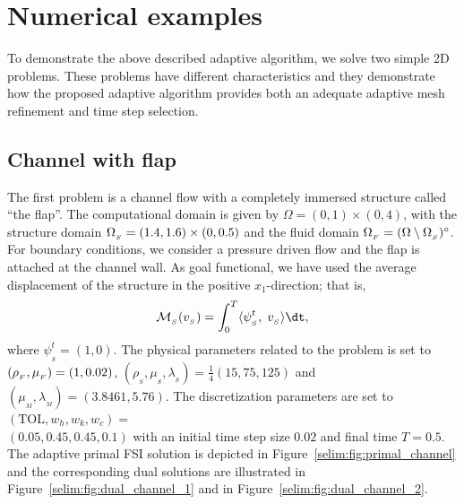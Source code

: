 \section{Numerical examples}

To demonstrate the above described adaptive algorithm, we solve two
simple 2D problems. These problems have different characteristics and
they demonstrate how the proposed adaptive algorithm provides both an
adequate adaptive mesh refinement and time step selection.

\subsection{Channel with flap}

The first problem is a channel flow with a completely immersed
structure called ``the flap''. The computational domain is given by
$\Omega = (0, 1)\times (0,4)$, with the structure domain $\Omega_{_{S}} = (1.4,
1.6)\times (0, 0.5)$ and the fluid domain $\Omega_{_{F}} = (\Omega\setminus
\Omega_{_{S}})^{\circ}$. For boundary conditions, we consider a pressure driven
flow and the flap is attached at the channel wall. As goal functional,
we have used the average displacement of the structure in the positive
$x_1$-direction; that is,
\begin{equation}
\label{selim:eq:goalfunctional_channel}
\M_{_{S}}(v_{_{S}}) = \int_0^T \langle \psi^t_{_{S}},\;
v_{_{S}}\rangle \dt,
\end{equation}
where $\psi^t_{_{S}} = (1,0)$. The physical parameters related to the
problem is set to $(\rho_{_{F}},\mu_{_{F}}) = (1, 0.02)$,
$(\rho_{_{S}},\mu_{_{S}}, \lambda_{_{S}}) = \tfrac{1}{4}(15, 75, 125)$
and $(\mu_{_{M}}, \lambda_{_{M}}) = (3.8461, 5.76)$. The
discretization parameters are set to $(\mathrm{TOL}, w_h, w_k,w_c) =$\\
$(0.05, 0.45, 0.45, 0.1)$ with an initial time step size $0.02$ and
final time $T=0.5$. The
adaptive primal FSI solution is depicted in
Figure~\ref{selim:fig:primal_channel} and the corresponding dual
solutions are illustrated in Figure~\ref{selim:fig:dual_channel_1}
and in Figure~\ref{selim:fig:dual_channel_2}.

